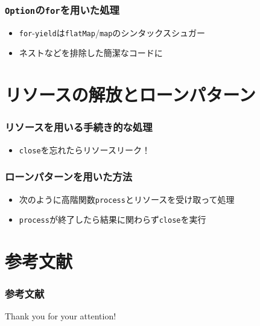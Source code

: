 \begin{frame}
  \frametitle{\protect\lstinline|Option|の\protect\lstinline|for|を用いた処理}


  \begin{itemize}
    \item<3-> \lstinline|for|-\lstinline|yield|は\lstinline|flatMap|/\lstinline|map|のシンタックスシュガー
    \item<4-> ネストなどを排除した簡潔なコードに
  \end{itemize}
\end{frame}

\begin{frame}
  \begin{center}
  \end{center}  
\end{frame}

\section{リソースの解放とローンパターン}


\begin{frame}
  \frametitle{リソースを用いる手続き的な処理}

  
  
  \begin{itemize}
    \item<2-> \lstinline|close|を忘れたらリソースリーク！
  \end{itemize}
\end{frame}

\begin{frame}
  \frametitle{ローンパターンを用いた方法}

  
  \begin{itemize}
    \item<3-> 次のように高階関数\lstinline|process|とリソースを受け取って処理
    \item<4-> \lstinline|process|が終了したら結果に関わらず\lstinline|close|を実行
  \end{itemize}
\end{frame}

\section*{参考文献}
\begin{frame}
  \frametitle{参考文献}

  
  \nocite{*}
  
\end{frame}

\begin{frame}
  \centering
  {\Huge Thank you for your attention!}
\end{frame}


